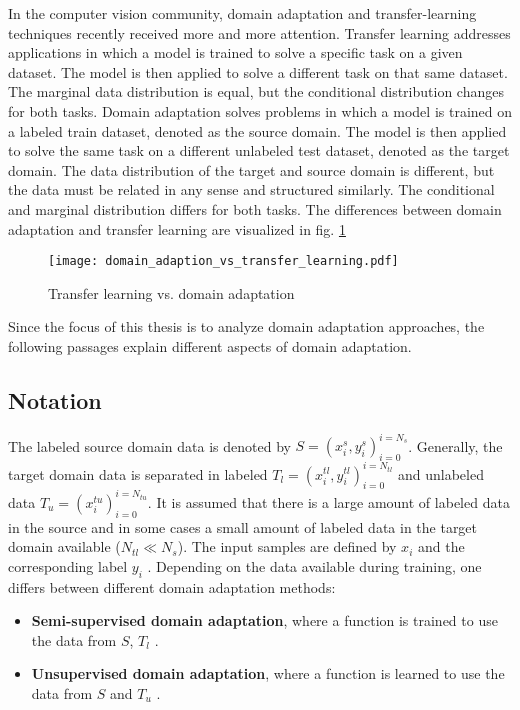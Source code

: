 In the computer vision community, domain adaptation and transfer-learning techniques recently received more and more attention. Transfer learning addresses applications in which a model is trained to solve a specific task on a given dataset. The model is then applied to solve a different task on that same dataset. The marginal data distribution is equal, but the conditional distribution changes for both tasks. Domain adaptation solves problems in which a model is trained on a labeled train dataset, denoted as the source domain. The model is then applied to solve the same task on a different unlabeled test dataset, denoted as the target domain. The data distribution of the target and source domain is different, but the data must be related in any sense and structured similarly. The conditional and marginal distribution differs for both tasks. The differences between domain adaptation and transfer learning are visualized in fig. \ref{fig:domain_adaption_vs_transfer_learning}

\begin{figure}[H]
  \centering
  \texttt{[image: domain\_adaption\_vs\_transfer\_learning.pdf]}
  \caption {Transfer learning vs. domain adaptation} \label{fig:domain_adaption_vs_transfer_learning}
\end{figure}

Since the focus of this thesis is to analyze domain adaptation approaches, the following passages explain different aspects of domain adaptation.
\subsection{Notation}
The labeled source domain data is denoted by  $S = {(x_{i}^{s}, y_{i}^{s})_{i = 0}^{i = N_{s}}}$. Generally, the target domain data is separated in labeled $T_{l} = {(x_{i}^{tl}, y_{i}^{tl})_{i = 0}^{i = N_{tl}}}$ and unlabeled data $T_{u} = {(x_{i}^{tu})_{i = 0}^{i = N_{tu}}}$. It is assumed that there is a large amount of labeled data in the source and in some cases a small amount of labeled data in the target domain available ($N_{tl} \ll N_{s}$). The input samples are defined by $x_{i}$ and the corresponding label $y_{i}$  \cite{Patel2015}. Depending on the data available during training, one differs between different domain adaptation methods: 
\begin{itemize}
\item \textbf{Semi-supervised domain adaptation}, where a function is trained to use the data from $S$, $T_{l}$ \cite{Patel2015}. 
\item \textbf{Unsupervised domain adaptation}, where a function is learned to use the data from $S$ and $T_{u}$ \cite{Patel2015}.
\end{itemize}

